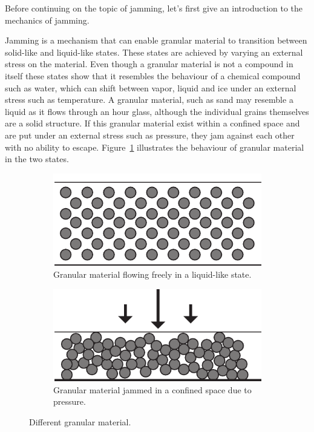 Before continuing on the topic of jamming, let's first give an introduction to the mechanics of jamming.

Jamming is a mechanism that can enable granular material to transition between solid-like and liquid-like states. 
These states are achieved by varying an external stress on the material.
Even though a granular material is not a compound in itself these states show that it resembles the behaviour of a chemical compound such as water, which can shift between vapor, liquid and ice under an external stress such as temperature.
A granular material, such as sand may resemble a liquid as it flows through an hour glass, although the individual grains themselves are a solid structure. 
If this granular material exist within a confined space and are put under an external stress such as pressure, they jam against each other with no ability to escape.
Figure~\ref{fig:ch:jamming:particles:jam_unjam} illustrates the behaviour of granular material in the two states.

\begin{figure}[h]
\centering
\begin{subfigure}[b]{.44\textwidth}
  \centering
  \includegraphics[width=\linewidth]{figures/jamming/particles_unjammed.pdf}
  \caption{Granular material flowing freely in a liquid-like state.}
\end{subfigure}%
\hspace{0.02\textwidth}
\begin{subfigure}[b]{.44\textwidth}
  \centering
  \includegraphics[width=\linewidth]{figures/jamming/particles_jammed.pdf}
  \caption{Granular material jammed in a confined space due to pressure.}
\end{subfigure}
\caption{Different granular material.}
\label{fig:ch:jamming:particles:jam_unjam}
\end{figure}

